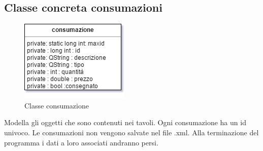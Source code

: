 \subsection{Classe concreta consumazioni}
\begin{figure}[htbp]
\centering
\includegraphics[scale=0.7]{res/sections/immagini/consumazione.png}
\caption{Classe consumazione}
\end{figure}

Modella gli oggetti che sono contenuti nei tavoli. Ogni consumazione ha un id univoco.
Le consumazioni non vengono salvate nel file .xml.
Alla terminazione del programma i dati a loro associati andranno persi.

